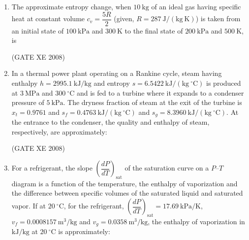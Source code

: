 \documentclass[12pt]{article}
\begin{document}
\begin{enumerate}
\item The approximate entropy change, when $10\ \mathrm{kg}$ of an ideal gas having specific heat at constant volume $c_v = \dfrac{5R}{2}$ (given, $R = 287\ \mathrm{J/(kg\ K)}$) is taken from an initial state of $100\ \mathrm{kPa}$ and $300\ \mathrm{K}$ to the final state of $200\ \mathrm{kPa}$ and $500\ \mathrm{K}$, is  

\begin{enumerate}
\end{enumerate}

(GATE XE 2008)

\item In a thermal power plant operating on a Rankine cycle, steam having enthalpy $h = 2995.1\ \mathrm{kJ/kg}$ and entropy $s = 6.5422\ \mathrm{kJ/(kg\ ^\circ C)}$ is produced at $3\ \mathrm{MPa}$ and $300\ ^\circ \mathrm{C}$ and is fed to a turbine where it expands to a condenser pressure of $5\ \mathrm{kPa}$. The dryness fraction of steam at the exit of the turbine is $x_t = 0.9761$ and $s_f = 0.4763\ \mathrm{kJ/(kg\ ^\circ C)}$ and $s_g = 8.3960\ \mathrm{kJ/(kg\ ^\circ C)}$. At the entrance to the condenser, the quality and enthalpy of steam, respectively, are approximately:  

\begin{enumerate}
\end{enumerate}

(GATE XE 2008)

\item For a refrigerant, the slope $\left( \dfrac{dP}{dT} \right)_{\mathrm{sat}}$ of the saturation curve on a $P$–$T$ diagram is a function of the temperature, the enthalpy of vaporization and the difference between specific volumes of the saturated liquid and saturated vapor. If at $20\ ^\circ\mathrm{C}$, for the refrigerant, $\left( \dfrac{dP}{dT} \right)_{\mathrm{sat}} = 17.69\ \mathrm{kPa/K}$, $v_f = 0.0008157\ \mathrm{m^3/kg}$ and $v_g = 0.0358\ \mathrm{m^3/kg}$, the enthalpy of vaporization in $\mathrm{kJ/kg}$ at $20\ ^\circ\mathrm{C}$ is approximately:  


\end{enumerate}
\end{document}
